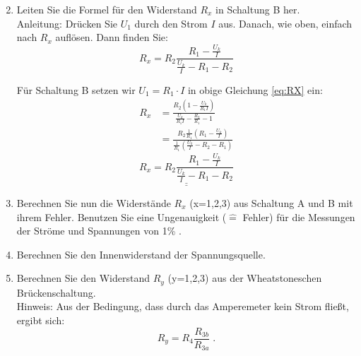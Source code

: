 \begin{enumerate}
\begin{solution}
\begin{equation}
		\end{equation}
	\end{solution}
 \item Leiten Sie die Formel für den Widerstand $R_x$ in Schaltung B her.\\
  Anleitung: Drücken Sie $U_1$ durch den Strom $I$ aus. Danach, wie oben, einfach nach $R_x$ auflösen. Dann finden Sie:
  \begin{equation}
   R_x = R_2 \frac{R_1 - \frac{U_k}{I}}{\frac{U_k}{I}-R_1-R_2}
  \end{equation}
	\begin{solution}
	Für Schaltung B setzen wir $U_1=R_1\cdot I$ in obige Gleichung \ref{eq:RX} ein:
		\begin{align*}
			R_x & = \frac{R_2\left(1-\frac{U_k}{R_1 I}\right)}{\frac{U_k}{R_1 I}-\frac{R_2}{R_1} - 1}\\
					& = \frac{R_2 \frac{1}{R_1}\left(R_1 - \frac{U_k}{I}\right)}{\frac{1}{R_1}\left(\frac{U_k}{I}-R_2-R_1\right)}
		\end{align*}
		\begin{equation}
			\underline{\underline{R_x = R_2\frac{R_1-\frac{U_k}{I}}{\frac{U_k}{I}-R_1-R_2}}}
		\end{equation}
	\end{solution}
 \item Berechnen Sie nun die Widerstände $R_x$ (x=1,2,3) aus Schaltung A und B mit ihrem Fehler. 
  Benutzen Sie eine Ungenauigkeit ($\hat{=}$ Fehler) für die Messungen der Ströme und Spannungen von 1\% .
 \item Berechnen Sie den Innenwiderstand der Spannungsquelle.
 \item Berechnen Sie den Widerstand $R_y$ (y=1,2,3) aus der Wheatstoneschen Brückenschaltung.\\
  Hinweis: Aus der Bedingung, dass durch das Amperemeter kein Strom fließt, ergibt sich:
  \begin{equation}
   R_y = R_4\frac{R_{3b}}{R_{3a}} \; .
  \end{equation}
\end{enumerate}